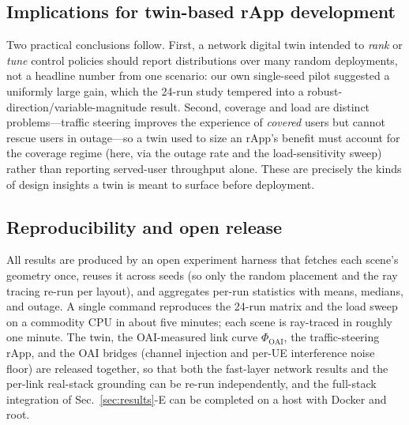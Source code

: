 \documentclass[conference]{IEEEtran}
\begin{document}
\subsection{Implications for twin-based rApp development}
Two practical conclusions follow. First, a network digital twin intended to
\emph{rank} or \emph{tune} control policies should report distributions over many
random deployments, not a headline number from one scenario: our own single-seed
pilot suggested a uniformly large gain, which the 24-run study tempered into a
robust-direction/variable-magnitude result. Second, coverage and load are distinct
problems---traffic steering improves the experience of \emph{covered} users but
cannot rescue users in outage---so a twin used to size an rApp's benefit must
account for the coverage regime (here, via the outage rate and the load-sensitivity
sweep) rather than reporting served-user throughput alone. These are precisely the
kinds of design insights a twin is meant to surface before deployment.

\subsection{Reproducibility and open release}
All results are produced by an open experiment harness that fetches each scene's
geometry once, reuses it across seeds (so only the random placement and the ray
tracing re-run per layout), and aggregates per-run statistics with means, medians,
and outage. A single command reproduces the 24-run matrix and the load sweep on a
commodity CPU in about five minutes; each scene is ray-traced in roughly one
minute. The twin, the OAI-measured link curve $\Phi_{\mathrm{OAI}}$, the
traffic-steering rApp, and the OAI bridges (channel injection and per-UE
interference noise floor) are released together, so that both the fast-layer
network results and the per-link real-stack grounding can be re-run independently,
and the full-stack integration of Sec.~\ref{sec:results}-E can be completed on a
host with Docker and root.
\end{document}
